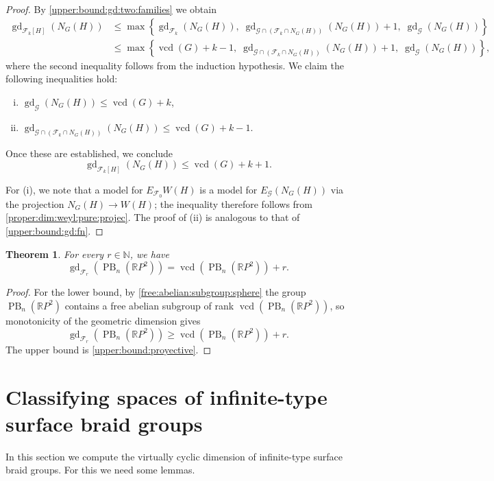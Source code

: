 \documentclass[a4paper,12pt,leqno]{amsart}
\newtheorem{theorem}{Theorem}[section]
\theoremstyle{definition}
\DeclareMathOperator{\vcd}{vcd}
\DeclareMathOperator{\gd}{gd}
\DeclareMathOperator{\pb}{PB}
\begin{document}
\begin{proof}
By \cref{upper:bound:gd:two:families} we obtain
\begin{align*}
  \gd_{\mathcal{F}_k[H]}(N_G(H))
    &\leq \max\!\left\{
        \gd_{\mathcal{F}_k}(N_G(H)),\;
        \gd_{\mathcal{G} \cap (\mathcal{F}_k \cap N_G(H))}(N_G(H)) + 1,\;
        \gd_{\mathcal{G}}(N_G(H))
      \right\} \\
    &\leq \max\!\left\{
        \vcd(G) + k - 1,\;
        \gd_{\mathcal{G} \cap (\mathcal{F}_k \cap N_G(H))}(N_G(H)) + 1,\;
        \gd_{\mathcal{G}}(N_G(H))
      \right\},
\end{align*}
where the second inequality follows from the induction hypothesis.
We claim the following inequalities hold:
\begin{enumerate}[i)]
  \item $\gd_{\mathcal{G}}(N_G(H)) \leq \vcd(G) + k$,
  \item $\gd_{\mathcal{G} \cap (\mathcal{F}_k \cap N_G(H))}(N_G(H)) \leq \vcd(G) + k - 1$.
\end{enumerate}
Once these are established, we conclude
\[
  \gd_{\mathcal{F}_k[H]}(N_G(H)) \leq \vcd(G) + k + 1.
\]

For (i), we note that a model for $E_{\mathcal{F}_0}W(H)$ is a model for $E_{\mathcal{G}}(N_G(H))$
via the projection $N_G(H) \to W(H)$; the inequality therefore follows from \cref{proper:dim:weyl:pure:projec}.
The proof of (ii) is analogous to that of \cref{upper:bound:gd:fn}.
\end{proof}


\begin{theorem}
For every $r \in \mathbb{N}$, we have
\[
  \gd_{\mathcal{F}_r}(\pb_n(\mathbb{R}P^2)) = \vcd(\pb_n(\mathbb{R}P^2)) + r.
\]
\end{theorem}

\begin{proof}
For the lower bound, by \cref{free:abelian:subgroup:sphere} the group $\pb_n(\mathbb{R}P^2)$ contains a free abelian subgroup of rank $\vcd(\pb_n(\mathbb{R}P^2))$, so monotonicity of the geometric dimension gives
\[
  \gd_{\mathcal{F}_r}(\pb_n(\mathbb{R}P^2)) \geq \vcd(\pb_n(\mathbb{R}P^2)) + r.
\]
The upper bound is \cref{upper:bound:proyective}.
\end{proof}

\section{Classifying spaces of infinite-type surface braid groups}\label{virt:abelian:dimension:surface:braid:groups:inf}
In this section we compute the virtually cyclic dimension of infinite-type surface braid groups. For this we need some lemmas.
\end{document}
